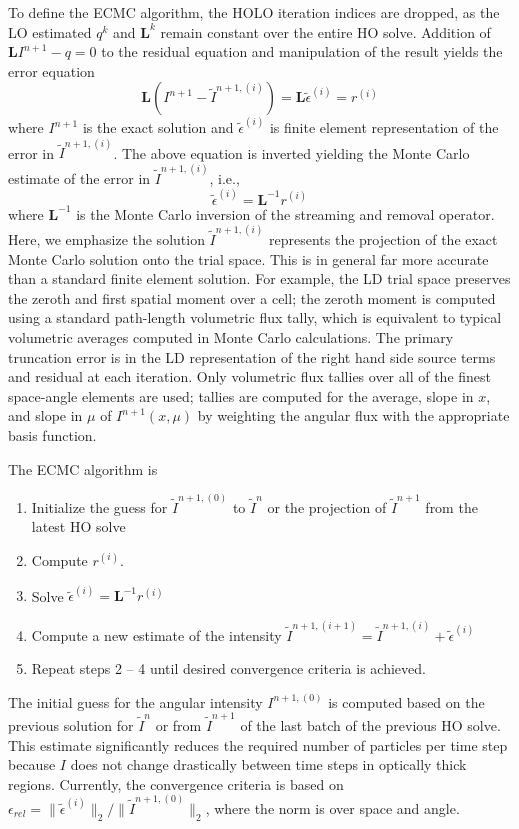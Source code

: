 \documentclass{mc2013}
\newcommand{\B}[1]{\ensuremath{\mathbf{#1}}}
\begin{document}
To define the ECMC algorithm, the HOLO iteration indices
are dropped, as the LO estimated $q^{k}$ and $\B L^{k}$ remain constant over the entire HO solve.
Addition of $\B L I^{n+1} - q=0$ to the residual equation 
and manipulation of the result yields the error equation
\begin{equation}
    \B L (I^{n+1} - \tilde{I}^{n+1,(i)}) = \B L \tilde{\epsilon}^{(i)} = r^{(i)}
\end{equation}
where $I^{n+1}$ is the exact solution and $\tilde{\epsilon}^{(i)}$ is finite element
representation of the error in
$\tilde{I}^{n+1,(i)}$. The above equation is inverted yielding the Monte Carlo
estimate of the error in $\tilde{I}^{n+1,(i)}$, i.e.,
\begin{equation}
\tilde{\epsilon}^{(i)} = \B L^{-1} r^{(i)}
\end{equation}
where $\B L^{-1}$ is the Monte Carlo inversion of the streaming and removal operator.
Here, we emphasize the solution $\tilde{I}^{n+1,(i)}$ represents the projection of the exact Monte Carlo
solution onto the trial space.  This is in general far more accurate than a standard finite element solution.
For example, the LD trial space preserves the zeroth and first spatial moment over a
cell; the zeroth moment is computed using a standard path-length volumetric flux tally, which
is equivalent to typical volumetric averages computed in Monte Carlo calculations.  The primary truncation error is in the LD
representation of the right hand side source terms and residual at each
iteration.  Only volumetric flux tallies over all of the finest space-angle
elements are used; tallies are computed for the average, slope in $x$, and slope in $\mu$ of
$I^{n+1}(x,\mu)$ by weighting the angular flux with the appropriate basis function.
  
The ECMC algorithm is
\begin{enumerate}
    \item Initialize the guess for $\tilde{I}^{n+1,(0)}$ to $\tilde{I}^{n}$ or the
        projection of $\tilde{I}^{n+1}$ from the latest HO solve
\item Compute $r^{(i)}$.
\item Solve $\tilde{\epsilon}^{(i)} = \B L^{-1} r^{(i)}$
\item Compute a new estimate of the intensity $\tilde I^{n+1,(i+1)} = \tilde I^{n+1,(i)}
+ \tilde\epsilon^{(i)}$
\item Repeat steps 2 -- 4 until desired convergence criteria is achieved. 
\end{enumerate}
The initial guess for the angular intensity $I^{n+1,(0)}$ is computed based on the previous solution
for $\tilde{I}^{n}$ or from $\tilde{I}^{n+1}$ of the last batch of the previous
HO solve. This estimate significantly reduces the required number of
particles per time step because $I$ does not change drastically between time steps in
optically thick regions.  Currently, the convergence criteria is based on $\epsilon_{rel} =
\|\tilde{\epsilon}^{(i)}\|_2/\|\tilde{I}^{n+1,(0)}\|_2$, where the norm is over space
and angle. 
\end{document}
